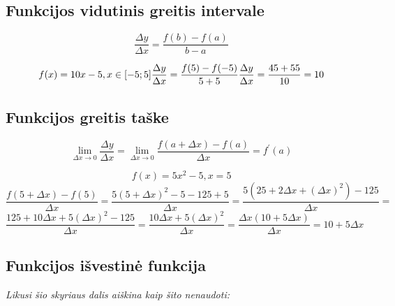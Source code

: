 \subsection{Funkcijos vidutinis greitis intervale}

\begin{equation}
    \frac{\Delta y}{\Delta x} = \frac{f(b) - f(a)}{b - a}
\end{equation}

\begin{equation}
    f(x) = 10x - 5, x \in [-5; 5] \\
    \frac{\Delta y}{\Delta x} = \frac{f(5) - f(-5)}{5 + 5} \\
    \frac{\Delta y}{\Delta x} = \frac{45 + 55}{10} = 10
\end{equation}

\subsection{Funkcijos greitis taške}

\begin{equation}
    \lim_{\Delta x \rightarrow 0} \frac{\Delta y}{\Delta x} = 
    \lim_{\Delta x \rightarrow 0} \frac{f(a + \Delta x) - f(a)}{\Delta x} = f^\prime(a)
\end{equation}

\begin{equation}
    f(x) = 5x^2 - 5, x = 5
\end{equation}
\begin{equation}
    \frac{f(5  + \Delta x) - f(5)}{\Delta x} = 
    \frac{5(5 + \Delta x)^2 - 5 - 125 + 5}{\Delta x} =
    \frac{5(25 + 2\Delta x + {(\Delta x)}^2) - 125}{\Delta x} =
\end{equation}
\begin{equation} 
    \frac{125 + 10\Delta x + 5{(\Delta x)}^2 - 125}{\Delta x} =
    \frac{10\Delta x + 5{(\Delta x)}^2}{\Delta x} =
    \frac{\Delta x (10 + 5\Delta x)}{\Delta x} = 10 + 5\Delta x
\end{equation}

\subsection{Funkcijos išvestinė funkcija}
\textit{Likusi šio skyriaus dalis aiškina kaip šito nenaudoti:}

